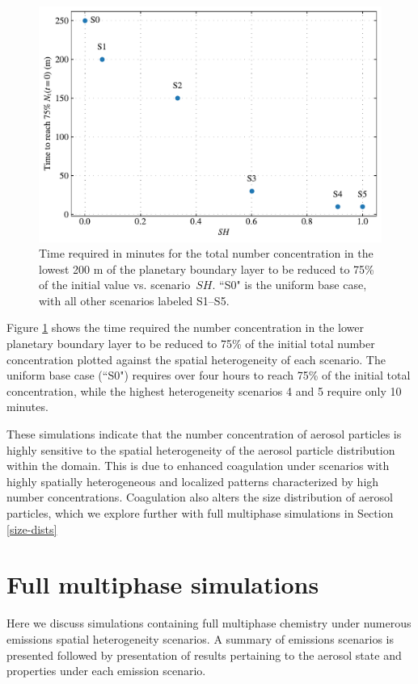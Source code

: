 \begin{figure}[!t]
  \centering
    \includegraphics[width=.8\textwidth]{figures/chapter5/ideal-coag/TimeTo75pcnt_vs_SH.pdf}
    \caption{Time required in minutes for the total number concentration in the lowest 200 m of the planetary boundary layer to be reduced to 75\% of the initial value vs. scenario~$SH$. ``S0" is the uniform base case, with all other scenarios labeled S1--S5.}
    \label{fig:numconc-timescales-to-75pcent}
\end{figure}

Figure \ref{fig:numconc-timescales-to-75pcent} shows the time required the number concentration in the lower planetary boundary layer to be reduced to 75\% of the initial total number concentration plotted against the spatial heterogeneity of each scenario. The uniform base case (``S0") requires over four hours to reach 75\% of the initial total concentration, while the highest heterogeneity scenarios 4 and 5 require only 10 minutes. 

These simulations indicate that the number concentration of aerosol particles is highly sensitive to the spatial heterogeneity of the aerosol particle distribution within the domain.  This is due to enhanced coagulation under scenarios with highly spatially heterogeneous and localized patterns characterized by high number concentrations. Coagulation also alters the size distribution of aerosol particles, which we explore further with full multiphase simulations in Section \ref{size-dists}

\section{Full multiphase simulations}

Here we discuss simulations containing full multiphase chemistry under numerous emissions spatial heterogeneity scenarios. A summary of emissions scenarios is presented followed by presentation of results pertaining to the aerosol state and properties under each emission scenario. 

